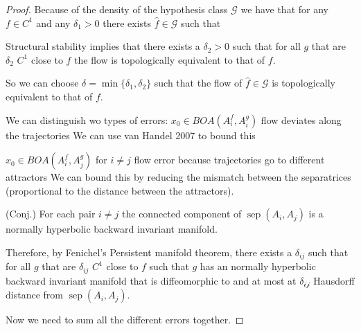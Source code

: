\documentclass{article}
\theoremstyle{definition}
\theoremstyle{remark}
\newcommand{\sep}{\operatorname{sep}}
\begin{document}
\begin{proof}
Because of the density of the hypothesis class $\mathcal{G}$ we have that for any $f\in C^1$ and any $\delta_1>0$
there exists $\hat f\in\mathcal{G}$ such that 


Structural stability implies that there exists a $\delta_2>0$ such that for all $g$ that are $\delta_2$ $C^1$ close to $f$ the flow is topologically equivalent to that of $f$.

So we can choose $\delta = \min\{\delta_1,\delta_2\}$ such that the flow of $\hat f\in\mathcal{G}$ is topologically equivalent to that of $f$.



We can distinguish wo types of errors:
$x_0\in BOA(A_i^f,A_i^g)$ flow deviates along the trajectories
We can use van Handel 2007 to bound this


$x_0\in BOA(A_i^f,A_j^g)$ for $i\neq j$
flow error because trajectories go to different attractors
We can bound this by reducing the mismatch between the separatrices (proportional to the distance between the attractors).

(Conj.) For each pair $i\neq j$ the connected component of $\sep(A_i,A_j)$ is a normally hyperbolic backward invariant manifold.

Therefore, by Fenichel's Persistent manifold theorem, there exists a $\delta_{ij}$ such that for all $g$ that are $\delta_{ij}$ $C^1$ close to $f$ such that $g$ has an  normally hyperbolic backward invariant manifold that is diffeomorphic to and at most at $\mathcal{\delta_{ij}}$ Hausdorff distance from $\sep(A_i,A_j)$.


Now we need to sum all the different errors together.
\end{proof}


\newpage

\end{document}
